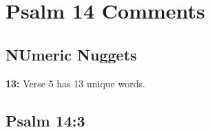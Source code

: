 \section{Psalm 14 Comments}

\subsection{NUmeric Nuggets}
\textbf{13:} Verse 5 has 13 unique words.

\subsection{Psalm 14:3}




 
 

